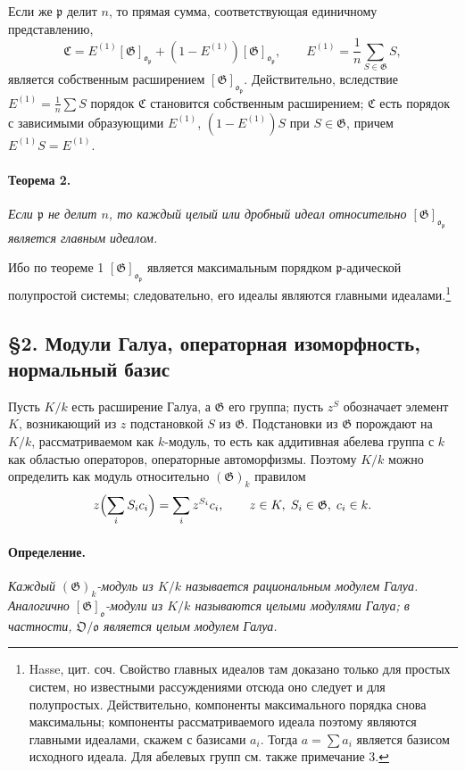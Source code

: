 \documentclass[11pt]{article}
\providecommand{\frakO}{\mathfrak{O}}
\providecommand{\frako}{\mathfrak{o}}
\providecommand{\frakp}{\mathfrak{p}}
\providecommand{\Gg}{\mathfrak{G}}
\begin{document}
Если же \(\frakp\) делит \(n\), то прямая сумма, соответствующая единичному представлению,
\[
        \mathfrak C=E^{(1)}[\Gg]_{\frako_\frakp}+(1-E^{(1)})[\Gg]_{\frako_\frakp},
        \qquad
        E^{(1)}=\frac1n\sum_{S\in\Gg} S,
\]
является собственным расширением \([\Gg]_{\frako_\frakp}\). Действительно, вследствие \(E^{(1)}=\frac1n\sum S\) порядок \(\mathfrak C\) становится собственным расширением; \(\mathfrak C\) есть порядок с зависимыми образующими \(E^{(1)}\), \((1-E^{(1)})S\) при \(S\in\Gg\), причем \(E^{(1)}S=E^{(1)}\).

\paragraph{Теорема 2.}
\emph{Если \(\frakp\) не делит \(n\), то каждый целый или дробный идеал относительно \([\Gg]_{\frako_\frakp}\) является главным идеалом.}

Ибо по теореме 1 \([\Gg]_{\frako_\frakp}\) является максимальным порядком \(\frakp\)-адической полупростой системы; следовательно, его идеалы являются главными идеалами.\footnote{Hasse, цит. соч. Свойство главных идеалов там доказано только для простых систем, но известными рассуждениями отсюда оно следует и для полупростых. Действительно, компоненты максимального порядка снова максимальны; компоненты рассматриваемого идеала поэтому являются главными идеалами, скажем с базисами \(a_i\). Тогда \(a=\sum a_i\) является базисом исходного идеала. Для абелевых групп см. также примечание 3.}

\subsection*{§2. Модули Галуа, операторная изоморфность, нормальный базис}

Пусть \(K/k\) есть расширение Галуа, а \(\Gg\) его группа; пусть \(z^S\) обозначает элемент \(K\), возникающий из \(z\) подстановкой \(S\) из \(\Gg\). Подстановки из \(\Gg\) порождают на \(K/k\), рассматриваемом как \(k\)-модуль, то есть как аддитивная абелева группа с \(k\) как областью операторов, операторные автоморфизмы. Поэтому \(K/k\) можно определить как модуль относительно \((\Gg)_k\) правилом
\[
        z\Bigl(\sum_i S_i c_i\Bigr)=\sum_i z^{S_i}c_i,
        \qquad z\in K,\; S_i\in\Gg,\; c_i\in k.
\]

\paragraph{Определение.}
\emph{Каждый \((\Gg)_k\)-модуль из \(K/k\) называется рациональным модулем Галуа. Аналогично \([\Gg]_\frako\)-модули из \(K/k\) называются целыми модулями Галуа; в частности, \(\frakO/\frako\) является целым модулем Галуа.}
\end{document}
